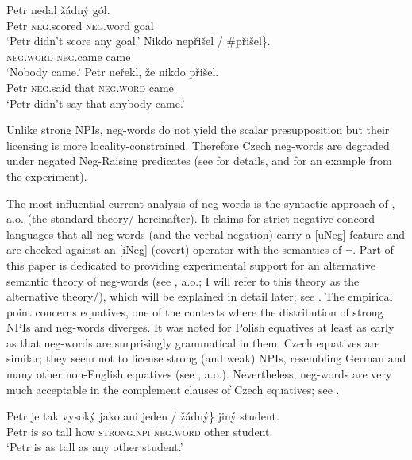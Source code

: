 \documentclass[output=paper,colorlinks,citecolor=brown]{langscibook}
\begin{document}
\ea\label{ex-3}  
\ea \gll Petr nedal žádný gól.\\
  Petr \textsc{neg}.scored \textsc{neg}.word goal\\
  \glt `Petr didn't score any goal.' 
\ex \gll Nikdo  \minsp{\{} nepřišel / \#přišel\}.\\
  \textsc{neg.word} {} \textsc{neg}.came {} came\\
  \glt `Nobody came.' 
\ex \gll *Petr neřekl, že nikdo přišel.\\
  Petr \textsc{neg}.said that \textsc{neg.word} came\\
  \glt `Petr didn't say that anybody came.'
\z\z 


\noindent Unlike strong NPIs, neg-words do not yield the scalar presupposition but their licensing is more locality-constrained. Therefore Czech neg-words are degraded under negated Neg-Raising predicates (see \citealt{dovcekal2016experimentala,docekaldotlacilsubedinb} for details, and  for an example from the experiment).

The most influential current analysis of neg-words is the syntactic approach of \citet{zeijlstra2004sentential}, a.o. (the standard theory/\cite{zeijlstra2004sentential} hereinafter). It claims for strict negative-concord languages that all neg-words (and the verbal negation) carry a [uNeg] feature and are checked against an [iNeg] (covert) operator with the semantics of $\neg$. Part of this paper is dedicated to providing experimental support for an alternative semantic theory of neg-words (see \citealt{ovalle2004double,kuhn2022dynamics}, a.o.; I will refer to this theory as the alternative theory/\cite{ovalle2004double}), which will be explained in detail later; see . The empirical point concerns equatives, one of the contexts where the distribution of strong NPIs and neg-words diverges. It was noted for Polish equatives at least as early as \citet{Blasczak:2001} that neg-words are surprisingly grammatical in them. Czech equatives are similar; they seem not to license strong (and weak) NPIs, resembling German and many other non-English equatives (see \citealt{krifka1992some}, a.o.). Nevertheless,  neg-words are very much acceptable in the complement clauses of Czech equatives; see .  

\ea\label{ex-4} \gll Petr je tak vysoký jako \minsp{\{\#} {ani jeden} / žádný\} jiný student.\\
Petr is so tall how {} \textsc{strong.npi} {} \textsc{neg.word} other student.\\
\glt `Petr is as tall as any other student.'
\z
\end{document}
